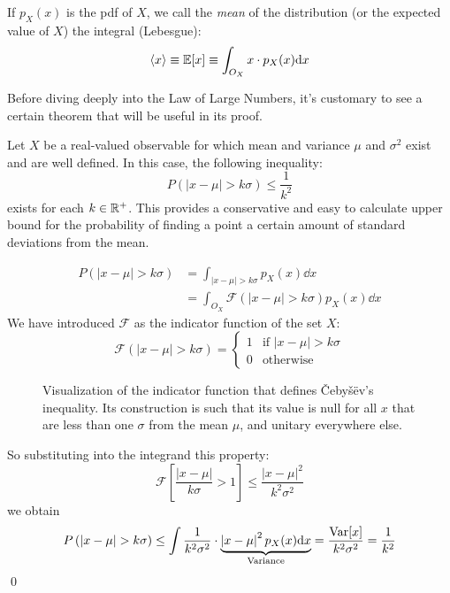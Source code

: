 \begin{definition}[Mean]
	If $p_X(x)$ is the pdf of $X$, we call the \emph{mean} of the distribution (or the expected value of $X$) the integral (Lebesgue):
	\[
	\langle x\rangle\equiv \mathbb{E}[x] \equiv \int_{O_X} x\cdot p_X(x)\mathrm{d} x
	\]
\label{def:mean}
\end{definition}

Before diving deeply into the Law of Large Numbers, it's customary to see a certain theorem that will be useful in its proof.

\begin{lemma}
	Let $X$ be a real-valued observable for which mean and variance $\mu$ and $\sigma^2$ exist and are well defined. In this case, the following inequality:
	\begin{equation}
		P\left( \left| x-\mu \right|>k\sigma \right)\leq \frac{1}{k^2}
		\label{eq:chebyshev}
	\end{equation}
	exists for each $k\in\mathbb{R}^+$. This provides a conservative and easy to calculate upper bound for the probability of finding a point a certain amount of standard deviations from the mean. 
\end{lemma}

\begin{example}
	\begin{align*}
		P\left( \left| x-\mu \right|>k\sigma \right) &= \int_{\left| x-\mu \right|>k\sigma} p_X(x)\dd x \\
		&= \int_{O_X} \mathscr{F}\left( \left| x-\mu \right|>k\sigma \right)p_X(x)\dd x
	\end{align*}
	We have introduced $\mathscr{F}$ as the indicator function of the set $X$:
	\[
	\mathscr{F}\left( \left| x-\mu \right|>k\sigma \right) = \begin{cases} 1 & \text{if } \left| x-\mu \right|>k\sigma  \\ 0 &  \text{otherwise} \end{cases}
	\]
	\begin{figure}[H]
		\centering
		
		\caption{Visualization of the indicator function that defines Čebyšëv's inequality. Its construction is such that its value is null for all $x$ that are less than one $\sigma$ from the mean $\mu$, and unitary everywhere else.}
	\end{figure}
	So substituting into the integrand this property:
	\[
	\mathscr{F}\left[ \frac{\left| x-\mu \right|}{k\sigma} > 1 \right] \leq \frac{\left| x-\mu \right|^2}{k^2\sigma^2} 
	\]
	we obtain 
	\[
	P\left( \left| x-\mu \right|>k\sigma \right) \leq \int \frac{1}{k^2\sigma^2}\cdot \underbrace{\left| x-\mu \right|^2 p_X(x)\dd x}_{\text{Variance}} = \frac{\Var[x]}{k^2\sigma^2} = \frac{1}{k^2}
	\]
	\qed
\end{example}

